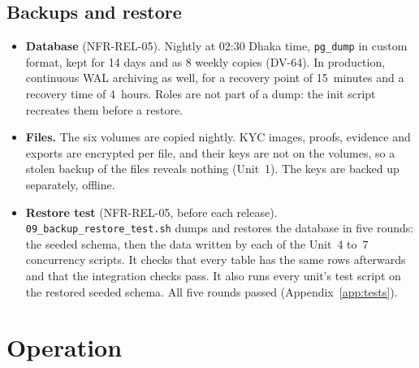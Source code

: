 \documentclass[11pt,a4paper]{article}
\begin{document}
\subsection{Backups and restore}
\label{sec:backup}
\begin{itemize}[nosep]
  \item \textbf{Database} (NFR-REL-05). Nightly at 02:30 Dhaka time, \texttt{pg\_dump} in custom format, kept for 14 days and as 8 weekly copies (DV-64). In production, continuous WAL archiving as well, for a recovery point of 15~minutes and a recovery time of 4~hours. Roles are not part of a dump: the init script recreates them before a restore.
  \item \textbf{Files.} The six volumes are copied nightly. KYC images, proofs, evidence and exports are encrypted per file, and their keys are not on the volumes, so a stolen backup of the files reveals nothing (Unit~1). The keys are backed up separately, offline.
  \item \textbf{Restore test} (NFR-REL-05, before each release). \texttt{09\_\allowbreak backup\_\allowbreak restore\_\allowbreak test.\allowbreak sh} dumps and restores the database in five rounds: the seeded schema, then the data written by each of the Unit~4 to~7 concurrency scripts. It checks that every table has the same rows afterwards and that the integration checks pass. It also runs every unit's test script on the restored seeded schema. All five rounds passed (Appendix~\ref{app:tests}).
\end{itemize}

\section{Operation}
\label{sec:ops}
\end{document}

